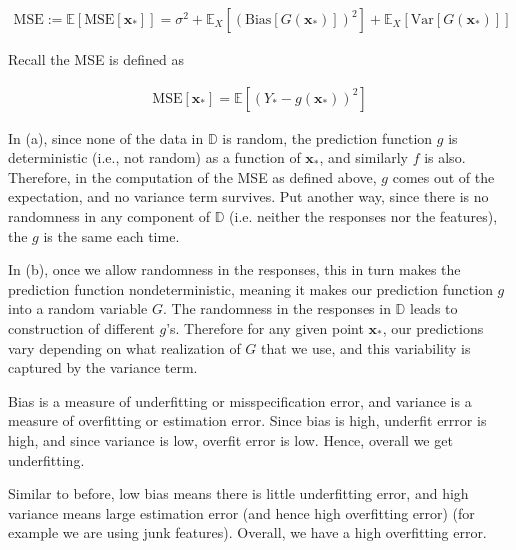 \documentclass[12pt]{article}
\begin{document}
\begin{enumerate}
\begin{align*}
	\text{MSE} := \mathbb{E}[\text{MSE}[\bm{x}_*]] = \sigma^2 + \mathbb{E}_X[(\text{Bias}[G(\bm{x}_*)])^2] + \mathbb{E}_X[\text{Var}[G(\bm{x}_*)]]
\end{align*}


Recall the MSE is defined as

\begin{align*}
	\text{MSE}[\bm{x}_*] = \mathbb{E}[(Y_* - g(\bm{x}_*))^2]
\end{align*}

In (a), since none of the data in $\mathbb{D}$ is random, the prediction function
$g$ is deterministic (i.e., not random) as a function of $\bm{x}_*$,
and similarly $f$ is also. Therefore, in the computation of the MSE as defined
above, $g$ comes out of the expectation, and no variance term survives.
Put another way, since there is no randomness in any component of $\mathbb{D}$
(i.e. neither the responses nor the features), the $g$ is the same each time.

In (b), once we allow randomness in the responses, this in turn makes the
prediction function nondeterministic, meaning it makes our prediction
function $g$ into a random variable $G$. The randomness in the responses
in $\mathbb{D}$ leads to construction of different $g$'s.
Therefore for any given point $\bm{x}_*$, our predictions vary depending on what
realization of $G$ that we use, and this variability is captured by the variance
term.


Bias is a measure of underfitting or misspecification error,
and variance is a measure of overfitting or estimation error. Since
bias is high, underfit errror is high, and since variance is low, overfit
error is low. Hence, overall we get underfitting.


Similar to before, low bias means there is little underfitting error,
and high variance means large estimation error (and hence high overfitting error)
(for example we are using junk features). Overall, we have a high overfitting error.


\end{enumerate}
\end{document}
